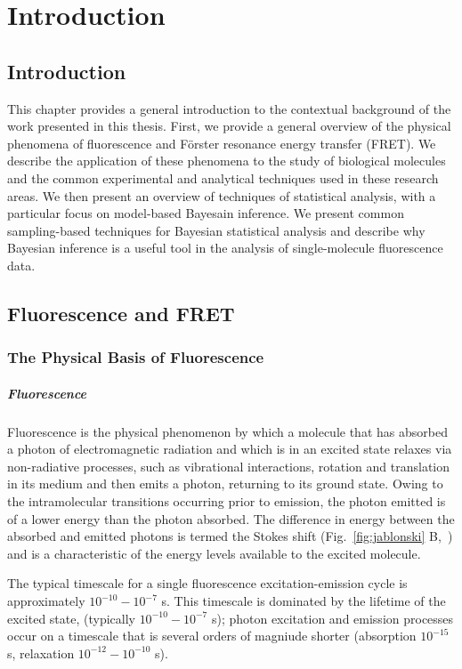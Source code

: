 \chapter{Introduction}
\label{chap:intro}
\section{Introduction}
This chapter provides a general introduction to the contextual background of the work presented in this thesis. First, we provide a general overview of the physical phenomena of fluorescence and F\"{o}rster resonance energy transfer (FRET). We describe the application of these phenomena to the study of biological molecules and the common experimental and analytical techniques used in these research areas. We then present an overview of techniques of statistical analysis, with a particular focus on model-based Bayesain inference. We present common sampling-based techniques for Bayesian statistical analysis and describe why Bayesian inference is a useful tool in the analysis of single-molecule fluorescence data.

\section{Fluorescence and FRET}
\subsection{The Physical Basis of Fluorescence}
\paragraph{Fluorescence}
Fluorescence is the physical phenomenon by which a molecule that has absorbed a photon of electromagnetic radiation and which is in an excited state relaxes via non-radiative processes, such as vibrational interactions, rotation and translation in its medium and then  emits a photon, returning to its ground state. Owing to the intramolecular transitions occurring prior to emission, the photon emitted is of a lower energy than the photon absorbed. The difference in energy between the absorbed and emitted photons is termed the Stokes shift (Fig.~\ref{fig:jablonski} B,~\cite{Albani2011}) and is a characteristic of the energy levels available to the excited molecule. 

The typical timescale for a single fluorescence excitation-emission cycle is approximately $10^{-10} - 10^{-7}$ s. This timescale is dominated by the lifetime of the excited state, (typically $10^{-10} - 10^{-7}$ s); photon excitation and emission processes occur on a timescale that is several orders of magniude shorter (absorption $10^{-15}$ s, relaxation $10^{-12} - 10^{-10}$ s).
 
